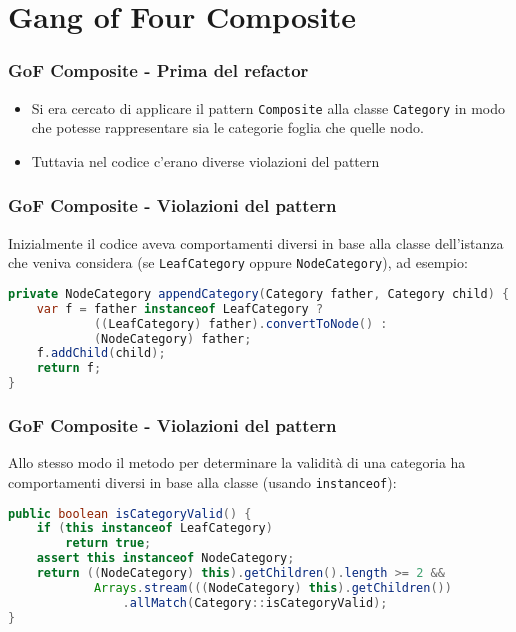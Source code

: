 \section{Gang of Four Composite}
\begin{frame}
    \frametitle{GoF Composite - Prima del refactor}

    \begin{minipage}{.5\textwidth}
        \begin{figure}
            \centering
        \end{figure}
    \end{minipage}
    \begin{minipage}{.49\textwidth}
        \begin{itemize}
            \item<1-> Si era cercato di applicare il pattern \texttt{Composite} alla classe \texttt{Category} in modo che potesse rappresentare sia le categorie foglia che quelle nodo.
            \item<2-> Tuttavia nel codice c'erano diverse violazioni del pattern
        \end{itemize}
    \end{minipage}

\end{frame}

\begin{frame}[fragile]
    \frametitle{GoF Composite - Violazioni del pattern}

    Inizialmente il codice aveva comportamenti diversi in base alla classe dell'istanza che veniva considera (se \texttt{LeafCategory} oppure \texttt{NodeCategory}), ad esempio:

    \lstset{style=java}
    \begin{lstlisting}[language=java, caption={v5 commit 34c1a67}]
private NodeCategory appendCategory(Category father, Category child) {
    var f = father instanceof LeafCategory ?
            ((LeafCategory) father).convertToNode() : 
            (NodeCategory) father;
    f.addChild(child);
    return f;
}
    \end{lstlisting}

\end{frame}

\begin{frame}[fragile]
    \frametitle{GoF Composite - Violazioni del pattern}

    Allo stesso modo il metodo per determinare la validità di una categoria ha comportamenti diversi in base alla classe (usando \texttt{instanceof}):

    \lstset{style=java}
    \begin{lstlisting}[language=java, caption={v5 commit 34c1a67}]
public boolean isCategoryValid() {
    if (this instanceof LeafCategory)
        return true;
    assert this instanceof NodeCategory;
    return ((NodeCategory) this).getChildren().length >= 2 &&
            Arrays.stream(((NodeCategory) this).getChildren())
                .allMatch(Category::isCategoryValid);
}
    \end{lstlisting}

\end{frame}

